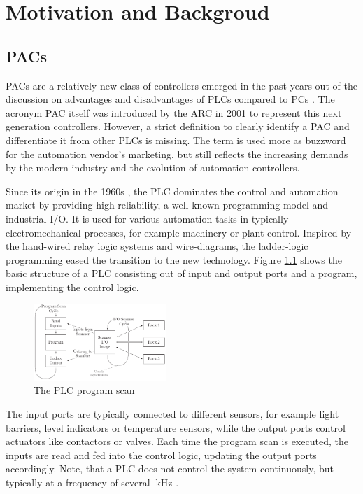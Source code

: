 \chapter{Motivation and Backgroud}
\section{\aclp{PAC}}
\aclp{PAC} are a relatively new class of controllers emerged in the past years
out of the discussion on advantages and disadvantages of \acp{PLC} compared to
\acp{PC} \citep{bel05}. The acronym \ac{PAC} itself was introduced by the
\ac{ARC} in 2001 \citep{pay13} to represent this next generation controllers.
However, a strict definition to clearly identify a \ac{PAC} and differentiate
it from other \acp{PLC} is missing. The term is used more as buzzword for the
automation vendor's marketing, but still reflects the increasing demands by
the modern industry and the evolution of automation controllers. 

Since its origin in the 1960s \citep{par99}, the \ac{PLC} dominates the
control and automation market by providing high reliability, a well-known
programming model and industrial I/O. It is used for various automation tasks
in typically electromechanical processes, for example machinery or plant
control. Inspired by the hand-wired relay logic systems and wire-diagrams, the
ladder-logic programming eased the transition to the new technology. Figure
\ref{fig:plc} shows the basic structure of a \ac{PLC} consisting out of input
and output ports and a program, implementing the control logic.
\begin{figure}
	\centering
	\includegraphics[width=5cm]{../figures/plc}
	\caption{The \acs{PLC} program scan \citep[adapted from][]{par99}}
	\label{fig:plc}
\end{figure}
The input ports are typically connected to different sensors, for example
light barriers, level indicators or temperature sensors, while the output
ports control actuators like contactors or valves. Each time the program scan
is executed, the inputs are read and fed into the control logic, updating the
output ports accordingly. Note, that a \ac{PLC} does not control the system
continuously, but typically at a frequency of several $\SI{}{\kilo\hertz}$
\citep{par99}.

